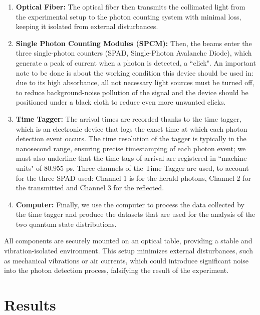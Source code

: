 \documentclass[prl,twocolumn]{revtex4-1}
\begin{document}
\begin{enumerate}
    \item \textbf{Optical Fiber:} The optical fiber then transmits the collimated light from the experimental setup to the photon counting system with minimal loss, keeping it isolated from external disturbances.
    \item \textbf{Single Photon Counting Modules (SPCM):} Then, the beams enter the three single-photon counters (SPAD, Single-Photon Avalanche Diode), which generate a peak of current when a photon is detected, a ``click". An important note to be done is about the working condition this device should be used in: due to its high absorbance, all not necessary light sources must be turned off, to reduce background-noise pollution of the signal and the device should be positioned under a black cloth to reduce even more unwanted clicks.
    \item \textbf{Time Tagger:} The arrival times are recorded thanks to the time tagger, which is an electronic device that logs the exact time at which each photon detection event occurs. The time resolution of the tagger is typically in the nanosecond range, ensuring precise timestamping of each photon event; we must also underline that the time tags of arrival are registered in ``machine units" of  $80.955$ ps. Three channels of the Time Tagger are used, to account for the three SPAD used: Channel 1 is for the herald photons, Channel 2 for the transmitted and Channel 3 for the reflected.
    \item \textbf{Computer:} Finally, we use the computer to process the data collected by the time tagger and produce the datasets that are used for the analysis of the two quantum state distributions.
\end{enumerate}

All components are securely mounted on an optical table, providing a stable and vibration-isolated environment. This setup minimizes external disturbances, such as mechanical vibrations or air currents, which could introduce significant noise into the photon detection process, falsifying the result of the experiment.

\section{Results}
\end{document}
